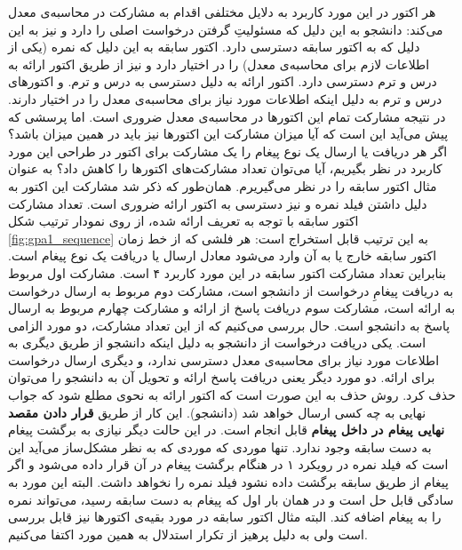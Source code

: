 هر اکتور در این مورد کاربرد به دلایل مختلفی اقدام به مشارکت در محاسبه‌ی معدل می‌کند: دانشجو به این دلیل که مسئولیتِ گرفتن درخواست اصلی را دارد و نیز به این دلیل که به اکتور سابقه دسترسی دارد. اکتور سابقه به این دلیل که نمره (یکی از اطلاعات لازم برای محاسبه‌ی معدل) را در اختیار دارد و نیز از طریق اکتور ارائه به درس و ترم دسترسی دارد. اکتور ارائه به دلیل دسترسی به درس و ترم. و اکتورهای درس و ترم به دلیل اینکه اطلاعات مورد نیاز برای محاسبه‌ی معدل را در اختیار دارند. در نتیجه مشارکت تمام این اکتورها در محاسبه‌ی معدل ضروری است. اما پرسشی که پیش می‌آید این است که آیا میزان مشارکت این اکتورها نیز باید در همین میزان باشد؟ اگر هر دریافت یا ارسال یک نوع پیغام را یک مشارکت برای اکتور در طراحی این مورد کاربرد در نظر بگیریم، آیا می‌توان تعداد مشارکت‌های اکتورها را کاهش داد؟ به عنوان مثال اکتور سابقه را در نظر می‌گیریرم. همان‌طور که ذکر شد مشارکت این اکتور به دلیل داشتن فیلد نمره و نیز دسترسی به اکتور ارائه ضروری است. تعداد مشارکت اکتور  سابقه با توجه به تعریف ارائه شده، از روی نمودار ترتیب شکل \ref{fig:gpa1_sequence} به این ترتیب قابل استخراج است: هر فلشی که از خط زمان اکتور سابقه خارج یا به آن وارد می‌شود معادل ارسال یا دریافت یک نوع پیغام است. بنابراین تعداد مشارکت اکتور سابقه در این مورد کاربرد ۴ است. مشارکت اول مربوط به دریافت پیغامِ درخواست از دانشجو است، مشارکت دوم مربوط به ارسال درخواست به ارائه است، مشارکت سوم دریافت پاسخ از ارائه و مشارکت چهارم مربوط به ارسال پاسخ به دانشجو است. حال بررسی می‌کنیم که از این تعداد مشارکت، دو مورد الزامی است. یکی دریافت درخواست از دانشجو به دلیل اینکه دانشجو از طریق دیگری به اطلاعات مورد نیاز برای محاسبه‌ی معدل دسترسی ندارد، و دیگری ارسال درخواست برای ارائه. دو مورد دیگر یعنی دریافت پاسخ ارائه و تحویل آن به دانشجو را می‌توان حذف کرد. روش حذف به این صورت است که اکتور ارائه به نحوی مطلع شود که جواب نهایی به چه کسی ارسال خواهد شد (دانشجو). این کار از طریق \textbf{قرار دادن مقصد نهایی پیغام در داخل پیغام} قابل انجام است. در این حالت دیگر نیازی به برگشت پیغام به دست سابقه وجود ندارد. تنها موردی که موردی که به نظر مشکل‌ساز می‌آید این است که فیلد نمره در رویکرد ۱ در هنگام برگشت پیغام در  آن قرار داده می‌شود و اگر پیغام از طریق سابقه برگشت داده نشود فیلد نمره را نخواهد داشت. البته این مورد به سادگی قابل حل است و در همان بار اول که پیغام به دست سابقه رسید، می‌تواند نمره را به پیغام اضافه کند. البته مثال اکتور سابقه در مورد بقیه‌ی اکتورها نیز قابل بررسی است ولی به دلیل پرهیز از تکرار استدلال به همین مورد اکتفا می‌کنیم.\\
